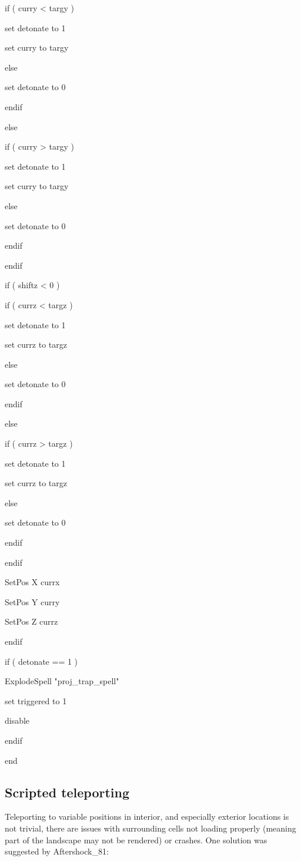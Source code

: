 \documentclass[
]{article}
\begin{document}
if ( curry \textless{} targy )

set detonate to 1

set curry to targy

else

set detonate to 0

endif

else

if ( curry \textgreater{} targy )

set detonate to 1

set curry to targy

else

set detonate to 0

endif

endif

if ( shiftz \textless{} 0 )

if ( currz \textless{} targz )

set detonate to 1

set currz to targz

else

set detonate to 0

endif

else

if ( currz \textgreater{} targz )

set detonate to 1

set currz to targz

else

set detonate to 0

endif

endif

SetPos X currx

SetPos Y curry

SetPos Z currz

endif

if ( detonate == 1 )

ExplodeSpell "proj\_trap\_spell"

set triggered to 1

disable

endif

end

\hypertarget{scripted-teleporting}{%
\subsection{Scripted teleporting}\label{scripted-teleporting}}

Teleporting to variable positions in interior, and especially exterior
locations is not trivial, there are issues with surrounding cells not
loading properly (meaning part of the landscape may not be rendered) or
crashes. One solution was suggested by Aftershock\_81:
\end{document}
